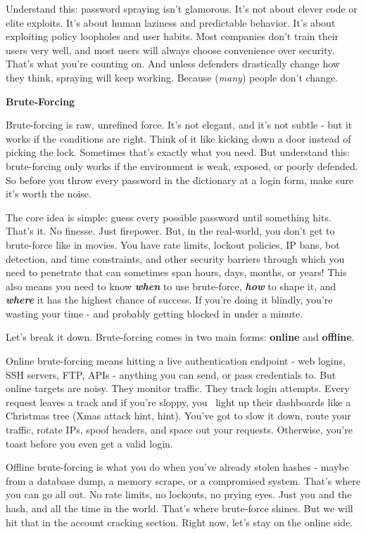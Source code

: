 Understand this: password spraying isn’t glamorous. It’s not about clever code or elite exploits. It’s about human laziness and predictable behavior. It’s about exploiting policy loopholes and user habits. Most companies don’t train their users very well, and most users will always choose convenience over security. That’s what you’re counting on. And unless defenders drastically change how they think, spraying will keep working. Because (\textit{many}) people don’t change.

\textbf{Brute-Forcing}

Brute-forcing is raw, unrefined force. It’s not elegant, and it’s not subtle - but it works if the conditions are right. Think of it like kicking down a door instead of picking the lock. Sometimes that’s exactly what you need. But understand this: brute-forcing only works if the environment is weak, exposed, or poorly defended. So before you throw every password in the dictionary at a login form, make sure it’s worth the noise.

The core idea is simple: guess every possible password until something hits. That’s it. No finesse. Just firepower. But, in the real-world, you don’t get to brute-force like in movies. You have rate limits, lockout policies, IP bans, bot detection, and time constraints, and other security barriers through which you need to penetrate that can sometimes span hours, days, months, or years! This also means you need to know \textit{\textbf{when}} to use brute-force, \textit{\textbf{how}} to shape it, and \textit{\textbf{where}} it has the highest chance of success. If you’re doing it blindly, you’re wasting your time - and probably getting blocked in under a minute.

Let’s break it down. Brute-forcing comes in two main forms: \textbf{online} and \textbf{offline}.

Online brute-forcing means hitting a live authentication endpoint - web logins, SSH servers, FTP, APIs - anything you can send, or pass credentials to. But online targets are noisy. They monitor traffic. They track login attempts. Every request leaves a track and if you’re sloppy, you  light up their dashboards like a Christmas tree (Xmas attack hint, hint). You’ve got to slow it down, route your traffic, rotate IPs, spoof headers, and space out your requests. Otherwise, you’re toast before you even get a valid login.

Offline brute-forcing is what you do when you’ve already stolen hashes - maybe from a database dump, a memory scrape, or a compromised system. That’s where you can go all out. No rate limits, no lockouts, no prying eyes. Just you and the hash, and all the time in the world. That’s where brute-force shines. But we will hit that in the account cracking section. Right now, let’s stay on the online side.

